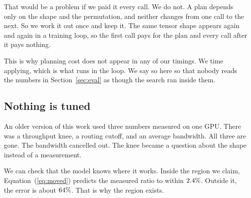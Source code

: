 That would be a problem if we paid it every call. We do not. A plan depends
only on the shape and the permutation, and neither changes from one call to the
next. So we work it out once and keep it. The same tensor shape appears again
and again in a training loop, so the first call pays for the plan and every
call after it pays nothing.

This is why planning cost does not appear in any of our timings. We time
applying, which is what runs in the loop. We say so here so that nobody reads
the numbers in Section~\ref{sec:eval} as though the search ran inside them.

\subsection{Nothing is tuned}

An older version of this work used three numbers measured on one GPU. There was
a throughput knee, a routing cutoff, and an average bandwidth. All three are
gone. The bandwidth cancelled out. The knee became a question about the shape
instead of a measurement.

We can check that the model knows where it works. Inside the region we claim,
Equation~(\ref{eq:moved}) predicts the measured ratio to within
$2.4\%$. Outside it, the error is about $64\%$. That is why
the region exists.
